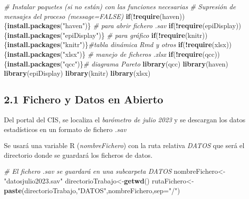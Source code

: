 \documentclass[
  12 pt,
  a4paper,
]{article}
\newenvironment{Shaded}{\begin{snugshade}}{\end{snugshade}}
\newcommand{\AttributeTok}[1]{\textcolor[rgb]{0.13,0.29,0.53}{#1}}
\newcommand{\CommentTok}[1]{\textcolor[rgb]{0.56,0.35,0.01}{\textit{#1}}}
\newcommand{\ControlFlowTok}[1]{\textcolor[rgb]{0.13,0.29,0.53}{\textbf{#1}}}
\newcommand{\FunctionTok}[1]{\textcolor[rgb]{0.13,0.29,0.53}{\textbf{#1}}}
\newcommand{\NormalTok}[1]{#1}
\newcommand{\OtherTok}[1]{\textcolor[rgb]{0.56,0.35,0.01}{#1}}
\newcommand{\SpecialCharTok}[1]{\textcolor[rgb]{0.81,0.36,0.00}{\textbf{#1}}}
\newcommand{\StringTok}[1]{\textcolor[rgb]{0.31,0.60,0.02}{#1}}
\begin{document}
\begin{Shaded}
\begin{Highlighting}[]
\CommentTok{\# Instalar paquetes (si no están) con las funciones necesarias}
\CommentTok{\# Supresión de mensajes del proceso (message=FALSE)}
\ControlFlowTok{if}\NormalTok{(}\SpecialCharTok{!}\FunctionTok{require}\NormalTok{(haven))\{}\FunctionTok{install.packages}\NormalTok{(}\StringTok{"haven"}\NormalTok{)\} }\CommentTok{\# para abrir fichero .sav}
\ControlFlowTok{if}\NormalTok{(}\SpecialCharTok{!}\FunctionTok{require}\NormalTok{(epiDisplay))\{}\FunctionTok{install.packages}\NormalTok{(}\StringTok{"epiDisplay"}\NormalTok{)\} }\CommentTok{\# para gráfico }
\ControlFlowTok{if}\NormalTok{(}\SpecialCharTok{!}\FunctionTok{require}\NormalTok{(knitr))\{}\FunctionTok{install.packages}\NormalTok{(}\StringTok{"knitr"}\NormalTok{)\}}\CommentTok{\#tabla dinámica Rmd y otros}
\ControlFlowTok{if}\NormalTok{(}\SpecialCharTok{!}\FunctionTok{require}\NormalTok{(xlsx))\{}\FunctionTok{install.packages}\NormalTok{(}\StringTok{"xlsx"}\NormalTok{)\} }\CommentTok{\# manejo de ficheros .xlsx}
\ControlFlowTok{if}\NormalTok{(}\SpecialCharTok{!}\FunctionTok{require}\NormalTok{(qcc))\{}\FunctionTok{install.packages}\NormalTok{(}\StringTok{"qcc"}\NormalTok{)\}}\CommentTok{\# diagrama Pareto    }
\FunctionTok{library}\NormalTok{(qcc)}
\FunctionTok{library}\NormalTok{(haven)}
\FunctionTok{library}\NormalTok{(epiDisplay)}
\FunctionTok{library}\NormalTok{(knitr)}
\FunctionTok{library}\NormalTok{(xlsx)}
\end{Highlighting}
\end{Shaded}

\hypertarget{fichero-y-datos-en-abierto}{%
\subsection{2.1 Fichero y Datos en
Abierto}\label{fichero-y-datos-en-abierto}}

Del portal del CIS, se localiza el \emph{barómetro de julio 2023} y se
descargan los datos estadísticos en un formato de fichero \emph{.sav}

Se usará una variable R (\emph{nombreFichero}) con la ruta relativa
\emph{DATOS} que será el directorio donde se guardará los ficheros de
datos.

\begin{Shaded}
\begin{Highlighting}[]
\CommentTok{\# El fichero .sav se guardará en una subcarpeta DATOS}
\NormalTok{nombreFichero}\OtherTok{\textless{}{-}}\StringTok{"datosjulio2023.sav"}
\NormalTok{directorioTrabajo}\OtherTok{\textless{}{-}}\FunctionTok{getwd}\NormalTok{()}
\NormalTok{rutaFichero}\OtherTok{\textless{}{-}}\FunctionTok{paste}\NormalTok{(directorioTrabajo,}\StringTok{"DATOS"}\NormalTok{,nombreFichero,}\AttributeTok{sep=}\StringTok{"/"}\NormalTok{)}
\end{Highlighting}
\end{Shaded}
\end{document}
